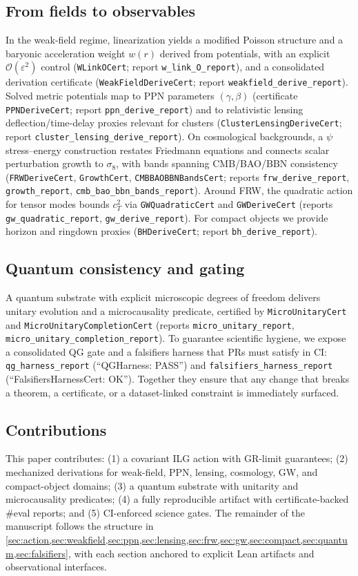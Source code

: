 \documentclass[aps,prd,twocolumn,superscriptaddress,nofootinbib,floatfix,longbibliography]{revtex4-2}
\newcommand{\Order}{\mathcal{O}}
\newcommand{\lean}[1]{\texttt{#1}}
\begin{document}
\subsection{From fields to observables}
In the weak-field regime, linearization yields a modified Poisson structure and a baryonic acceleration weight $w(r)$ derived from potentials, with an explicit $\Order(\varepsilon^2)$ control (\lean{WLinkOCert}; report \lean{w_link_O_report}), and a consolidated derivation certificate (\lean{WeakFieldDeriveCert}; report \lean{weakfield_derive_report}). Solved metric potentials map to PPN parameters $(\gamma,\beta)$ (certificate \lean{PPNDeriveCert}; report \lean{ppn_derive_report}) and to relativistic lensing deflection/time-delay proxies relevant for clusters (\lean{ClusterLensingDeriveCert}; report \lean{cluster_lensing_derive_report}). On cosmological backgrounds, a $\psi$ stress--energy construction restates Friedmann equations and connects scalar perturbation growth to $\sigma_8$, with bands spanning CMB/BAO/BBN consistency (\lean{FRWDeriveCert}, \lean{GrowthCert}, \lean{CMBBAOBBNBandsCert}; reports \lean{frw_derive_report}, \lean{growth_report}, \lean{cmb_bao_bbn_bands_report}). Around FRW, the quadratic action for tensor modes bounds $c_T^2$ via \lean{GWQuadraticCert} and \lean{GWDeriveCert} (reports \lean{gw_quadratic_report}, \lean{gw_derive_report}). For compact objects we provide horizon and ringdown proxies (\lean{BHDeriveCert}; report \lean{bh_derive_report}).

\subsection{Quantum consistency and gating}
A quantum substrate with explicit microscopic degrees of freedom delivers unitary evolution and a microcausality predicate, certified by \lean{MicroUnitaryCert} and \lean{MicroUnitaryCompletionCert} (reports \lean{micro_unitary_report}, \lean{micro_unitary_completion_report}). To guarantee scientific hygiene, we expose a consolidated QG gate and a falsifiers harness that PRs must satisfy in CI: \lean{qg_harness_report} (``QGHarness: PASS'') and \lean{falsifiers_harness_report} (``FalsifiersHarnessCert: OK''). Together they ensure that any change that breaks a theorem, a certificate, or a dataset-linked constraint is immediately surfaced.

\subsection{Contributions}
This paper contributes: (1) a covariant ILG action with GR-limit guarantees; (2) mechanized derivations for weak-field, PPN, lensing, cosmology, GW, and compact-object domains; (3) a quantum substrate with unitarity and microcausality predicates; (4) a fully reproducible artifact with certificate-backed \#eval reports; and (5) CI-enforced science gates. The remainder of the manuscript follows the structure in \cref{sec:action,sec:weakfield,sec:ppn,sec:lensing,sec:frw,sec:gw,sec:compact,sec:quantum,sec:falsifiers}, with each section anchored to explicit Lean artifacts and observational interfaces.
\end{document}
